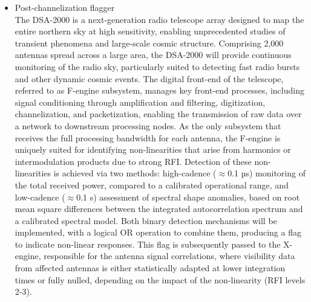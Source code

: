 \begin{itemize}
\item Post-channelization flagger\\
The DSA-2000 is a next-generation radio telescope array designed to map the entire northern sky at high sensitivity, enabling unprecedented studies of transient phenomena and large-scale cosmic structure. Comprising 2,000 antennas spread across a large area, the DSA-2000 will provide continuous monitoring of the radio sky, particularly suited to detecting fast radio bursts and other dynamic cosmic events. The digital front-end of the telescope, referred to as F-engine subsystem, manages key front-end processes, including signal conditioning through amplification and filtering, digitization, channelization, and packetization, enabling the transmission of raw data over a network to downstream processing nodes. As the only subsystem that receives the full processing bandwidth for each antenna, the F-engine is uniquely suited for identifying non-linearities that arise from harmonics or intermodulation products due to strong RFI. Detection of these non-linearities is achieved via two methods: high-cadence ($\approx$0.1 µs) monitoring of the total received power, compared to a calibrated operational range, and low-cadence ($\approx$0.1 s) assessment of spectral shape anomalies, based on root mean square differences between the integrated autocorrelation spectrum and a calibrated spectral model. Both binary detection mechanisms will be implemented, with a logical OR operation to combine them, producing a flag to indicate non-linear responses. This flag is subsequently passed to the X-engine, responsible for the antenna signal correlations, where visibility data from affected antennas is either statistically adapted at lower integration times or fully nulled, depending on the impact of the non-linearity (RFI levels 2-3).
\end{itemize}

